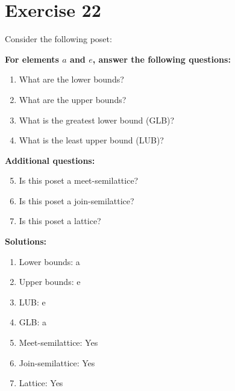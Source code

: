 \documentclass{article}
\begin{document}
\section*{Exercise 22}
Consider the following poset:
\begin{center}
\end{center}

    \textbf{For elements $a$ and $e$, answer the following questions:}
\begin{enumerate}
    \item What are the lower bounds?
    \item What are the upper bounds?
    \item What is the greatest lower bound (GLB)?
    \item What is the least upper bound (LUB)?
\end{enumerate}
    \hspace*{3ex} \textbf{Additional questions:}
\begin{enumerate}
    \setcounter{enumi}{4}
    \item Is this poset a meet-semilattice?
    \item Is this poset a join-semilattice?
    \item Is this poset a lattice?
\end{enumerate}

\textbf{Solutions:}
\begin{enumerate}
    \item Lower bounds: {a}
    \item Upper bounds: {e}
    \item LUB: e
    \item GLB: a
    \item Meet-semilattice: Yes
    \item Join-semilattice: Yes
    \item Lattice: Yes
\end{enumerate}
\newpage
\end{document}
